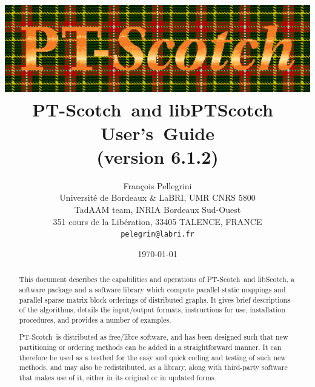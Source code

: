 \documentclass{article}
\newcommand{\libscotch}{{\sc libScotch}}         %
\newcommand{\ptscotch}{{\sc PT-Scotch}}          %
\newcommand{\libptscotch}{{\sc libPTScotch}}     %
\newcommand{\scotchver}{6.1}
\newcommand{\scotchversub}{6.1.2}
\begin{document}
\date{\today}

\title{\includegraphics[scale=0.8]{../misc/ptscotch_logo_color.ps}\\[1em]
       {\LARGE\bf \ptscotch\ and \libptscotch\ {\sc \scotchver} \mbox{User's Guide}}\\[1em]%
       {\normalsize (version \scotchversub)}
}

\author{Fran\c cois Pellegrini\\
Universit\'e de Bordeaux \& LaBRI, UMR CNRS 5800\\
TadAAM team, INRIA Bordeaux Sud-Ouest\\
351 cours de la Lib\'eration, 33405 TALENCE, FRANCE\\
{\tt pelegrin@labri.fr}}

\maketitle

\begin{abstract}

This document describes the capabilities and operations of
\ptscotch\ and \libscotch, a software package and a software library
which compute parallel static mappings and parallel sparse matrix
block orderings of distributed graphs. It gives brief descriptions of
the algorithms, details the input/output formats, instructions for
use, installation procedures, and provides a number of examples.

\ptscotch\ is distributed as free/libre software, and has been
designed such that new partitioning or ordering methods can be added
in a straightforward manner. It can therefore be used as a testbed for
the easy and quick coding and testing of such new methods, and may
also be redistributed, as a library, along with third-party software
that makes use of it, either in its original or in updated forms.
\end{abstract}

\clearpage


\tableofcontents
\end{document}

